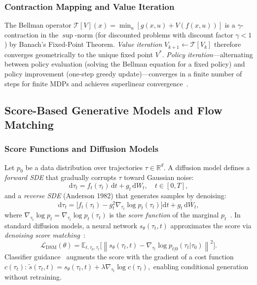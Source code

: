 \documentclass[letterpaper, 10pt, conference]{ieeeconf}
\newcommand{\R}{\mathbb{R}}
\newcommand{\E}{\mathbb{E}}
\newcommand{\norm}[1]{\left\|#1\right\|}
\newcommand{\dd}{\mathrm{d}}
\newcommand{\score}{\nabla_{\tau_t}\log p_t}
\begin{document}
\subsubsection{Contraction Mapping and Value Iteration}
The Bellman operator $\mathcal{T}[V](x) = \min_u[g(x,u) + V(f(x,u))]$ is a
$\gamma$-contraction in the $\sup$-norm (for discounted problems with discount
factor $\gamma < 1$) by Banach's Fixed-Point Theorem.  \emph{Value iteration}
$V_{k+1} \leftarrow \mathcal{T}[V_k]$ therefore converges geometrically to
the unique fixed point $V^*$.  \emph{Policy iteration}---alternating between
policy evaluation (solving the Bellman equation for a fixed policy) and policy
improvement (one-step greedy update)---converges in a finite number of steps
for finite MDPs and achieves superlinear convergence~\cite{bertsekas2012dp}.

\subsection{Score-Based Generative Models and Flow Matching}
\label{sec:fm}

\subsubsection{Score Functions and Diffusion Models}
Let $p_0$ be a data distribution over trajectories $\tau\in\R^d$.  A diffusion
model defines a \emph{forward SDE} that gradually corrupts $\tau$ toward
Gaussian noise:
\begin{equation}
  \dd\tau_t = f_t(\tau_t)\,\dd t + g_t\,\dd W_t,\quad t\in[0,T],
  \label{eq:forward_sde}
\end{equation}
and a \emph{reverse SDE} (Anderson 1982) that generates samples by denoising:
\begin{equation}
  \dd\tau_t = \bigl[f_t(\tau_t) - g_t^2\score(\tau_t)\bigr]\dd t
              + g_t\,\dd\bar{W}_t,
  \label{eq:reverse_sde}
\end{equation}
where $\score = \nabla_{\tau_t}\log p_t(\tau_t)$ is the \emph{score function}
of the marginal $p_t$~\cite{song2021score}.  In standard diffusion models, a
neural network $s_\theta(\tau_t,t)$ approximates the score via
\emph{denoising score matching}~\cite{ho2020ddpm}:
\begin{equation}
  \mathcal{L}_{\mathrm{DSM}}(\theta)
  = \E_{t,\tau_0,\tau_t}\!\bigl[\norm{s_\theta(\tau_t,t)
    - \nabla_{\tau_t}\log p_{t|0}(\tau_t|\tau_0)}^2\bigr].
  \label{eq:dsm}
\end{equation}
Classifier guidance~\cite{dhariwal2021diffusion} augments the score with the
gradient of a cost function $c(\tau_t)$:
$\tilde{s}(\tau_t,t) = s_\theta(\tau_t,t) + \lambda\nabla_{\tau_t}\log c(\tau_t),$
enabling conditional generation without retraining.
\end{document}
